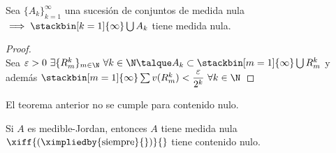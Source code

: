 	\begin{proposicion} Sea $\{A_k\}_{k=1}^\infty$ una sucesión de conjuntos de medida nula $\implies\stackbin[k=1]{\infty}\bigcup A_k$ tiene medida nula.
	\begin{proof}\ \\
	Sea $\varepsilon >0\ \exists \{R^k_m\}_{m\in\N}\ \forall k\in \N\talque A_k\subset \stackbin[m=1]{\infty}\bigcup R_m^k$ y además $\stackbin[m=1]{\infty}\sum v(R_m^k)<\dfrac{\varepsilon}{2^k}\ \forall k\in\N$
	\end{proof}
	\end{proposicion}

	\begin{observacion} El teorema anterior no se cumple para contenido nulo.
	\end{observacion}
	
	\begin{observacion} Si $A$ es medible-Jordan, entonces $A$ tiene medida nula $\xiff{\left(\ximpliedby{\mathrm{siempre}}{}\right)}{}$ tiene contenido nulo.
	\end{observacion}
